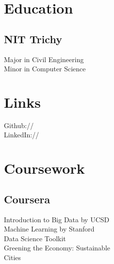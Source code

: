 \documentclass[]{deedy-resume-openfont}
\begin{document}
%
%
\lastupdated

%
%



%
%

\begin{minipage}[t]{0.33\textwidth} 


\section{Education} 

\subsection{NIT Trichy}
Major in Civil Engineering \\
Minor in Computer Science \\  
\sectionsep


\section{Links} 
Github:// \href{https://github.com/jaiakash}{} \\
LinkedIn://  \href{https://www.linkedin.com/in/akashjaiswal03}{} \\
\sectionsep


\section{Coursework}
\subsection{Coursera}
Introduction to Big Data by UCSD \\
Machine Learning by Stanford\\
Data Science Toolkit\\
Greening the Economy: Sustainable \\Cities 
\sectionsep


\end{minipage}
\end{document}
